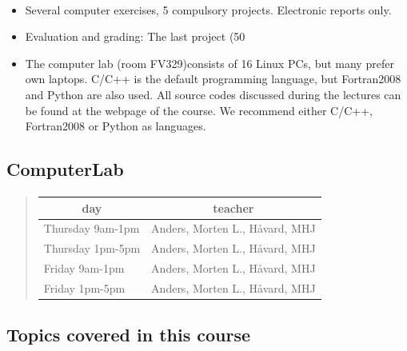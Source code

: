 \documentclass[%
oneside,                 %
final,                   %
10pt]{article}
\begin{document}
\paragraph{}
\begin{itemize}
  \item Several computer exercises, 5 compulsory projects. Electronic reports only.

  \item Evaluation and grading: The last project (50%

  \item The computer lab (room FV329)consists of 16 Linux PCs, but many prefer own laptops. C/C++ is the default programming language, but Fortran2008 and Python are also used. All source codes discussed during the lectures can be found at the webpage of the course. We recommend either C/C++, Fortran2008 or Python as languages.
\end{itemize}

\noindent



\subsection*{ComputerLab}


\paragraph{}


\begin{quote}
\begin{tabular}{ll}
\hline
\multicolumn{1}{c}{ day } & \multicolumn{1}{c}{ teacher } \\
\hline
Thursday 9am-1pm & Anders, Morten L., Håvard, MHJ \\
Thursday 1pm-5pm & Anders, Morten L., Håvard, MHJ \\
Friday 9am-1pm   & Anders, Morten L., Håvard, MHJ \\
Friday 1pm-5pm   & Anders, Morten L., Håvard, MHJ \\
\hline
\end{tabular}
\end{quote}

\noindent



\subsection*{Topics covered in this course}
\end{document}
